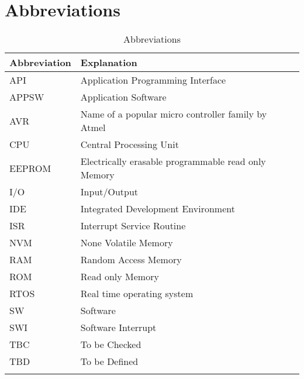 \chapter*{Abbreviations}
\label{secAbbreviations}

\begin{longtable}[c]{|l|l|}
\hline
Abbreviation & Explanation
\\ \hline
API	    & Application Programming Interface                    \\ \hline
APPSW	  & Application Software                                 \\ \hline
AVR     & Name of a popular micro controller family by Atmel   \\ \hline
CPU     & Central Processing Unit                              \\ \hline
EEPROM	& Electrically erasable programmable read only Memory  \\ \hline
I/O	    & Input/Output                                         \\ \hline
IDE	    & Integrated Development Environment                   \\ \hline
ISR	    & Interrupt Service Routine                            \\ \hline
NVM     & None Volatile Memory                                 \\ \hline
RAM	    & Random Access Memory                                 \\ \hline
ROM	    & Read only Memory                                     \\ \hline
RTOS    & Real time operating system                           \\ \hline
SW	    & Software                                             \\ \hline
SWI	    & Software Interrupt                                   \\ \hline
TBC	    & To be Checked                                        \\ \hline
TBD	    & To be Defined                                        \\ \hline
\caption{Abbreviations} \label{tabAbbrev}
\end{longtable}

